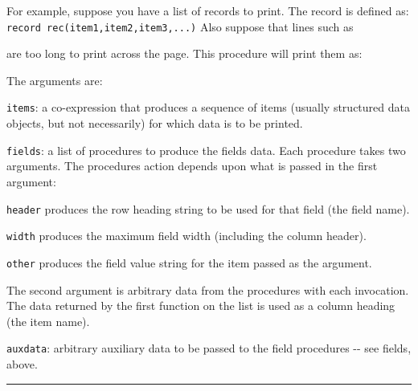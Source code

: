 For example, suppose you have a list of records to print. The record is
defined as:\\
\texttt{record rec(item1,item2,item3,...)} Also suppose that lines such
as


are too long to print across the page. This procedure will print them
as:


The arguments are:

\texttt{items}: a co-expression that produces a sequence of items
(usually structured data objects, but not necessarily) for which data
is to be printed.

\texttt{fields}: a list of procedures to produce the
field{\textquotesingle}s data. Each procedure takes two arguments. The
procedure{\textquotesingle}s action depends upon what is passed in the
first argument:

\texttt{header} produces the row heading string to be used for that
field (the field name).

\texttt{width} produces the maximum field width (including the column
header).

\texttt{other} produces the field value string for the item passed as
the argument.

The second argument is arbitrary data from the procedures with each
invocation. The data returned by the first function on the list is used
as a column heading (the item name).

\texttt{auxdata}: arbitrary auxiliary data to be passed to the field
procedures -{}- see {\textasciigrave}fields{\textquotesingle}, above.

\vspace{0.25cm}\hrule{}


